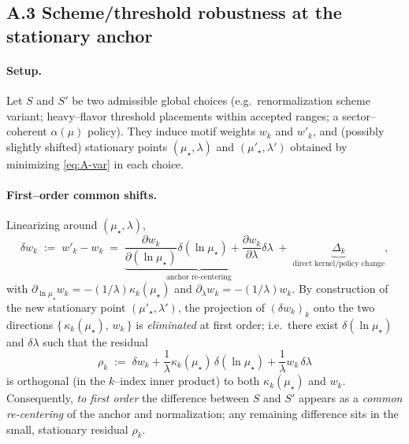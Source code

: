\documentclass[epjc3]{svjour3}
\begin{document}
\subsection*{A.3 Scheme/threshold robustness at the stationary anchor}

\paragraph{Setup.}
Let $S$ and $S'$ be two admissible global choices (e.g.\ renormalization scheme variant; heavy--flavor threshold placements within accepted ranges; a sector--coherent $\alpha(\mu)$ policy). They induce motif weights $w_k$ and $w'_k$, and (possibly slightly shifted) stationary points $(\mu_\star,\lambda)$ and $(\mu'_\star,\lambda')$ obtained by minimizing \eqref{eq:A-var} in each choice.

\paragraph{First--order common shifts.}
Linearizing around $(\mu_\star,\lambda)$,
\begin{equation}
  \delta w_k\;:=\;w'_k-w_k
  \;=\;\underbrace{\frac{\partial w_k}{\partial(\ln\mu_\star)}\delta(\ln\mu_\star)
  +\frac{\partial w_k}{\partial\lambda}\delta\lambda}_{\text{anchor re-centering}}
  \;+\;\underbrace{\Delta_k}_{\text{direct kernel/policy change}},
  \label{eq:A-w-diff}
\end{equation}
with $\partial_{\ln\mu_\star}w_k=-(1/\lambda)\kappa_k(\mu_\star)$ and $\partial_\lambda w_k=-(1/\lambda)w_k$.
By construction of the new stationary point $(\mu'_\star,\lambda')$, the projection of $(\delta w_k)_k$ onto the two directions $\{\,\kappa_k(\mu_\star),\,w_k\,\}$ is \emph{eliminated} at first order; i.e.\ there exist $\delta(\ln\mu_\star)$ and $\delta\lambda$ such that the residual
\begin{equation}
  \rho_k\;:=\;\delta w_k+\frac{1}{\lambda}\kappa_k(\mu_\star)\,\delta(\ln\mu_\star)
                   +\frac{1}{\lambda}w_k\,\delta\lambda
  \label{eq:A-rho}
\end{equation}
is orthogonal (in the $k$--index inner product) to both $\kappa_k(\mu_\star)$ and $w_k$. Consequently, \emph{to first order} the difference between $S$ and $S'$ appears as a \emph{common re-centering} of the anchor and normalization; any remaining difference sits in the small, stationary residual $\rho_k$.
\end{document}
